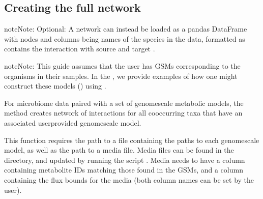 \documentclass[letterpaper,10pt,english]{sphinxmanual}
\begin{document}
\subsection{Creating the full network}
\label{\detokenize{usage:creating-the-full-network}}
\begin{sphinxadmonition}{note}{Note:}
\sphinxAtStartPar
Optional: A network can instead be loaded as a pandas DataFrame with nodes and columns being names of the species in the data, formatted
as  contains the interaction with source  and target .
\end{sphinxadmonition}

\begin{sphinxadmonition}{note}{Note:}
\sphinxAtStartPar
This guide assumes that the user has GSMs corresponding to the organisms in their samples. In the , we provide examples of how one might construct these models () using .
\end{sphinxadmonition}

\sphinxAtStartPar
For microbiome data paired with a set of genome\sphinxhyphen{}scale metabolic models, the method creates network of interactions for all co\sphinxhyphen{}occurring taxa that have an associated user\sphinxhyphen{}provided genome\sphinxhyphen{}scale model.

\begin{sphinxVerbatim}[commandchars=\\\{\}]
   

  
\end{sphinxVerbatim}

\sphinxAtStartPar
This function requires the path to a file containing the paths to each genome\sphinxhyphen{}scale model, as well as the path to a media file. Media files
can be found in the  directory, and updated by running the script . Media needs to have a column containing
metabolite IDs matching those found in the GSMs, and a column containing the flux bounds for the media (both column names can be set by the user).
\end{document}

